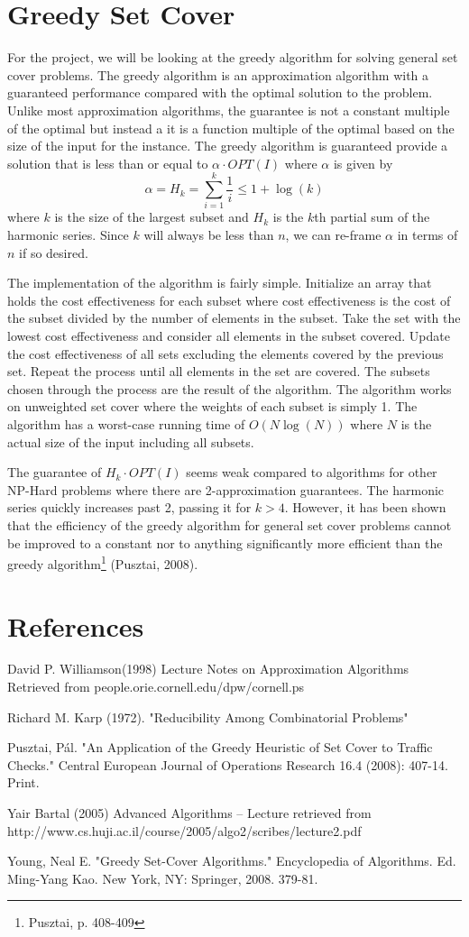 \documentclass[12pt]{report}
\begin{document}
\section{Greedy Set Cover}
For the project, we will be looking at the greedy algorithm for solving general set cover problems. The greedy algorithm is an approximation algorithm with a guaranteed performance compared with the optimal solution to the problem. Unlike most approximation algorithms, the guarantee is not a constant multiple of the optimal but instead a it is a function multiple of the optimal based on the size of the input for the instance. The greedy algorithm is guaranteed provide a solution that is less than or equal to $\alpha \cdot OPT(I)$ where $\alpha$ is given by $$\alpha = H_k = \sum_{i=1}^k \frac{1}{i}\leq 1+\log(k)$$ where $k$ is the size of the largest subset and $H_k$ is the $k$th partial sum of the harmonic series. Since $k$ will always be less than $n$, we can re-frame $\alpha$ in terms of $n$ if so desired.

The implementation of the algorithm is fairly simple. Initialize an array that holds the cost effectiveness for each subset where cost effectiveness is the cost of the subset divided by the number of elements in the subset. Take the set with the lowest cost effectiveness and consider all elements in the subset covered. Update the cost effectiveness of all sets excluding the elements covered by the previous set. Repeat the process until all elements in the set are covered. The subsets chosen through the process are the result of the algorithm. The algorithm works on unweighted set cover where the weights of each subset is simply 1. The algorithm has a worst-case running time of $O(N\log(N))$ where $N$ is the actual size of the input including all subsets.

The guarantee of $H_k\cdot OPT(I)$ seems weak compared to algorithms for other NP-Hard problems where there are 2-approximation guarantees. The harmonic series quickly increases past 2, passing it for $k>4$. However, it has been shown that the efficiency of the greedy algorithm for general set cover problems cannot be improved to a constant nor to anything significantly more efficient than the greedy algorithm\footnote{Pusztai, p. 408-409} (Pusztai, 2008).

\section{References}
David P. Williamson(1998) Lecture Notes on Approximation Algorithms Retrieved from people.orie.cornell.edu/dpw/cornell.ps

Richard M. Karp (1972). "Reducibility Among Combinatorial Problems"

Pusztai, Pál. "An Application of the Greedy Heuristic of Set Cover to Traffic Checks." Central European Journal of Operations Research 16.4 (2008): 407-14. Print.

Yair Bartal (2005) Advanced Algorithms – Lecture retrieved from http://www.cs.huji.ac.il/course/2005/algo2/scribes/lecture2.pdf

Young, Neal E. "Greedy Set-Cover Algorithms." Encyclopedia of Algorithms. Ed. Ming-Yang Kao. New York, NY: Springer, 2008. 379-81.
\end{document}
